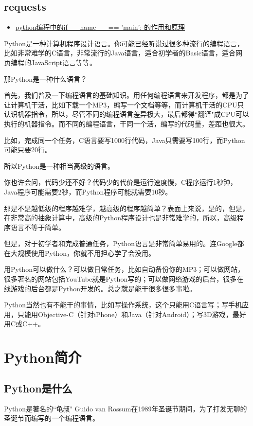 \subsection{requests}

\begin{itemize}
\item \href{http://www.dengfeilong.com/post/60.html}{python编程中的if \_\_name\_\_ == 'main': 的作用和原理}
\end{itemize}

Python是一种计算机程序设计语言。你可能已经听说过很多种流行的编程语言，比如非常难学的C语言，非常流行的Java语言，适合初学者的Basic语言，适合网页编程的JavaScript语言等等。

那Python是一种什么语言？

首先，我们普及一下编程语言的基础知识。用任何编程语言来开发程序，都是为了让计算机干活，比如下载一个MP3，编写一个文档等等，而计算机干活的CPU只认识机器指令，所以，尽管不同的编程语言差异极大，最后都得``翻译"成CPU可以执行的机器指令。而不同的编程语言，干同一个活，编写的代码量，差距也很大。

比如，完成同一个任务，C语言要写1000行代码，Java只需要写100行，而Python可能只要20行。

所以Python是一种相当高级的语言。

你也许会问，代码少还不好？代码少的代价是运行速度慢，C程序运行1秒钟，Java程序可能需要2秒，而Python程序可能就需要10秒。

那是不是越低级的程序越难学，越高级的程序越简单？表面上来说，是的，但是，在非常高的抽象计算中，高级的Python程序设计也是非常难学的，所以，高级程序语言不等于简单。

但是，对于初学者和完成普通任务，Python语言是非常简单易用的。连Google都在大规模使用Python，你就不用担心学了会没用。

用Python可以做什么？可以做日常任务，比如自动备份你的MP3；可以做网站，很多著名的网站包括YouTube就是Python写的；可以做网络游戏的后台，很多在线游戏的后台都是Python开发的。总之就是能干很多很多事啦。

Python当然也有不能干的事情，比如写操作系统，这个只能用C语言写；写手机应用，只能用Objective-C（针对iPhone）和Java（针对Android）；写3D游戏，最好用C或C++。

\section{Python简介}
\subsection{Python是什么}
Python是著名的``龟叔" Guido van Rossum在1989年圣诞节期间，为了打发无聊的圣诞节而编写的一个编程语言。

